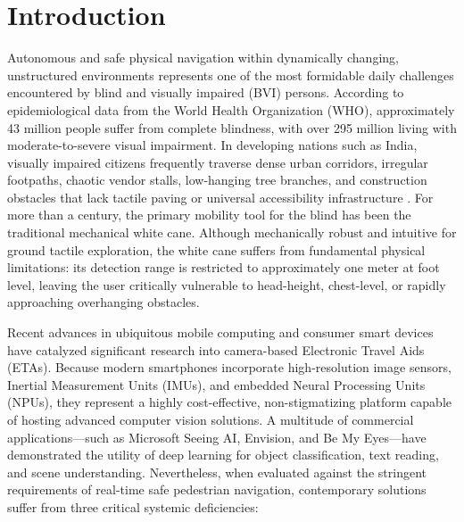 \documentclass[conference]{IEEEtran}
\begin{document}
\section{Introduction}
Autonomous and safe physical navigation within dynamically changing, unstructured environments represents one of the most formidable daily challenges encountered by blind and visually impaired (BVI) persons. According to epidemiological data from the World Health Organization (WHO), approximately 43 million people suffer from complete blindness, with over 295 million living with moderate-to-severe visual impairment. In developing nations such as India, visually impaired citizens frequently traverse dense urban corridors, irregular footpaths, chaotic vendor stalls, low-hanging tree branches, and construction obstacles that lack tactile paving or universal accessibility infrastructure \cite{b10}. For more than a century, the primary mobility tool for the blind has been the traditional mechanical white cane. Although mechanically robust and intuitive for ground tactile exploration, the white cane suffers from fundamental physical limitations: its detection range is restricted to approximately one meter at foot level, leaving the user critically vulnerable to head-height, chest-level, or rapidly approaching overhanging obstacles.

Recent advances in ubiquitous mobile computing and consumer smart devices have catalyzed significant research into camera-based Electronic Travel Aids (ETAs). Because modern smartphones incorporate high-resolution image sensors, Inertial Measurement Units (IMUs), and embedded Neural Processing Units (NPUs), they represent a highly cost-effective, non-stigmatizing platform capable of hosting advanced computer vision solutions. A multitude of commercial applications---such as Microsoft Seeing AI, Envision, and Be My Eyes---have demonstrated the utility of deep learning for object classification, text reading, and scene understanding. Nevertheless, when evaluated against the stringent requirements of real-time safe pedestrian navigation, contemporary solutions suffer from three critical systemic deficiencies:
\end{document}
